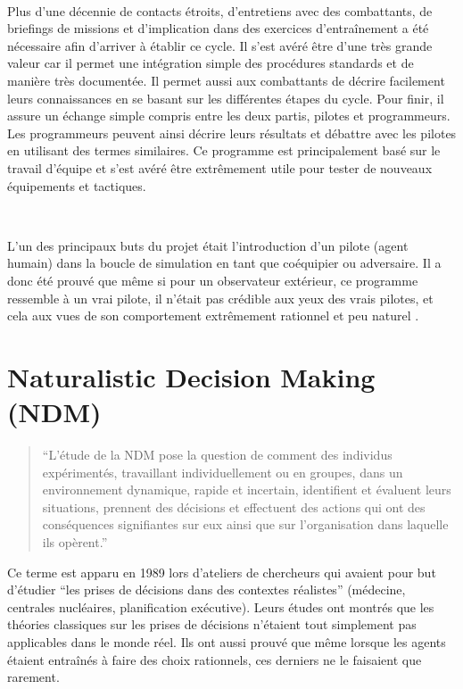 ~\par
Plus d'une décennie de contacts étroits, d'entretiens avec des combattants, de briefings de missions et d'implication dans des exercices d'entraînement a été nécessaire afin d’arriver à établir ce cycle. Il s’est avéré être d’une très grande valeur car il permet une intégration simple des procédures standards et de manière très documentée. Il permet aussi aux combattants de décrire facilement leurs connaissances en se basant sur les différentes étapes du cycle. Pour finir, il assure un échange simple compris entre les deux partis, pilotes et programmeurs. Les programmeurs peuvent ainsi décrire leurs résultats et débattre avec les pilotes en utilisant des termes similaires. Ce programme est principalement  basé sur le travail d’équipe et s’est avéré être extrêmement utile pour tester de nouveaux équipements et tactiques.

~\par
L’un des principaux buts du projet était l’introduction d’un pilote (agent humain) dans la boucle de simulation en tant que coéquipier ou adversaire. Il a donc été prouvé que même si pour un observateur extérieur, ce programme ressemble à un vrai pilote, il n’était pas crédible aux yeux des vrais pilotes, et cela aux vues de son comportement extrêmement rationnel et peu naturel \parencite{norling2000enhancing}.


\section{Naturalistic Decision Making (NDM)}

\begin{quotation}
“L’étude de la NDM  pose la question de comment des individus expérimentés, travaillant individuellement ou en groupes, dans un environnement dynamique, rapide et incertain, identifient et évaluent leurs situations, prennent des décisions et effectuent des actions qui ont des conséquences signifiantes sur eux ainsi que sur l'organisation dans laquelle ils opèrent.” \parencite{zsambok2014naturalistic} \end{quotation} 



Ce terme est apparu en 1989 lors d’ateliers de chercheurs qui avaient pour but d’étudier 
“les prises de décisions dans des contextes réalistes” (médecine, centrales nucléaires, planification exécutive). Leurs études ont montrés que les théories classiques sur les prises de décisions n’étaient tout simplement pas applicables dans le monde réel. Ils ont aussi prouvé que même lorsque les agents étaient entraînés à faire des choix rationnels, ces derniers ne le faisaient que rarement.

